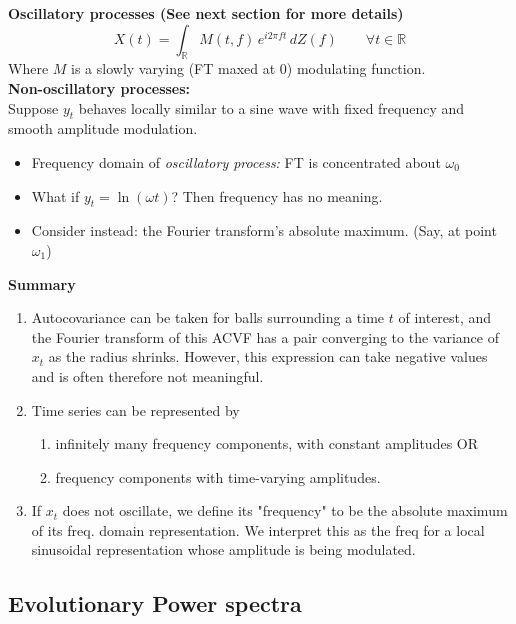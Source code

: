 \documentclass{article}
\begin{document}
{\textbf{Oscillatory processes (See next section for more details)}\\
\[X(t) = \int_{\mathbb{R}} M(t,f)\, e^{i2\pi ft}\, dZ(f) \qquad \forall t\in\mathbb{R}\]
Where $M$ is a slowly varying (FT maxed at 0) modulating function. \\

\textbf{Non-oscillatory processes: } \\
Suppose $y_t$ behaves locally similar to a sine wave with fixed frequency and smooth amplitude modulation.
\begin{itemize}
    \item Frequency domain of \textit{oscillatory process:} FT is concentrated about $\omega_0$
    \item What if $y_t = \ln(\omega t)$? Then frequency has no meaning.
    \item Consider instead: the Fourier transform's absolute maximum. (Say, at point $\omega_1$) \\
\end{itemize}

\textbf{Summary}
\begin{enumerate}
    \item Autocovariance can be taken for balls surrounding a time $t$ of interest, and the Fourier transform of this ACVF has a pair converging to the variance of $x_t$ as the radius shrinks. However, this expression can take negative values and is often therefore not meaningful.
    \item Time series can be represented by 
            \begin{enumerate}
                \item infinitely many frequency components, with constant amplitudes OR
                \item frequency components with time-varying amplitudes.
            \end{enumerate}
    \item If $x_t$ does not oscillate, we define its "frequency" to be the absolute maximum of its freq. domain representation. We interpret this as the freq for a local sinusoidal representation whose amplitude is being modulated.
\end{enumerate}}




\subsection{Evolutionary Power spectra}
\end{document}
